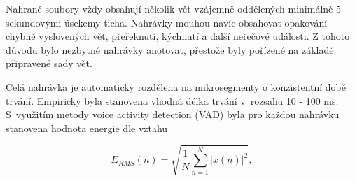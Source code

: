 \noindent
Nahrané soubory vždy obsahují několik vět vzájemně oddělených minimálně 5 sekundovými úsekemy ticha.
Nahrávky mouhou navíc obsahovat opakování chybně vyslovených vět, přeřeknutí, kýchnutí a další neřečové události.
Z tohoto důvodu bylo nezbytné nahrávky anotovat, přestože byly pořízené na základě připravené sady vět.

Celá nahrávka je automaticky rozdělena na mikrosegmenty o konzistentní době trvání. Empiricky byla stanovena vhodná délka trvání v~rozsahu 10 - 100 ms. S~využitím metody voice activity detection (VAD) byla pro každou nahrávku stanovena hodnota energie dle vztahu


\begin{equation}
  \label{eq:construction:energy}
  E_{RMS}(n) = \sqrt{\frac{1}{N} \sum_{n=1}^{N} \left| x(n) \right|^2},
\end{equation}


